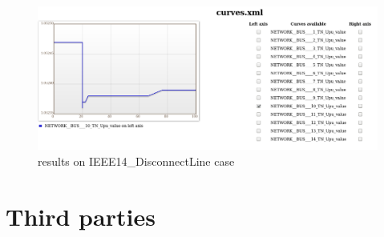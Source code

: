 \documentclass[a4paper, 12pt]{report}
\begin{document}
\begin{figure}[h!]
\centering
\includegraphics[width=\textwidth]{../resources/VoltageModule.png}
\caption{\Dynawo results on IEEE14\_DisconnectLine case}
\end{figure}

\section{Third parties}
\end{document}
